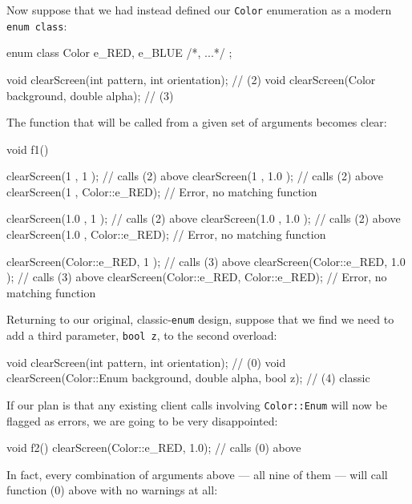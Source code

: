 \noindent Now suppose that we had instead defined our \texttt{Color} enumeration
as a modern \texttt{enum}~\texttt{class}:

\begin{emcppslisting}
enum class Color { e_RED, e_BLUE /*, ...*/ };

void clearScreen(int pattern, int orientation);    // (2)
void clearScreen(Color background, double alpha);  // (3)
\end{emcppslisting}

\noindent The function that will be called from a given set of arguments becomes
clear:

\begin{emcppslisting}
void f1()
{
    clearScreen(1           , 1           );  // calls (2) above
    clearScreen(1           , 1.0         );  // calls (2) above
    clearScreen(1           , Color::e_RED);  // Error, no matching function

    clearScreen(1.0         , 1           );  // calls (2) above
    clearScreen(1.0         , 1.0         );  // calls (2) above
    clearScreen(1.0         , Color::e_RED);  // Error, no matching function

    clearScreen(Color::e_RED, 1           );  // calls (3) above
    clearScreen(Color::e_RED, 1.0         );  // calls (3) above
    clearScreen(Color::e_RED, Color::e_RED);  // Error, no matching function
}
\end{emcppslisting}

\noindent Returning to our original, classic-\texttt{enum} design, suppose that we
find we need to add a third parameter, \texttt{bool}~\texttt{z}, to the
second overload:

\begin{emcppslisting}
void clearScreen(int pattern, int orientation);                  // (0)
void clearScreen(Color::Enum background, double alpha, bool z);  // (4) classic
\end{emcppslisting}

\noindent If our plan is that any existing client calls involving
\texttt{Color::Enum} will now be flagged as errors, we are going to be
very disappointed:

\begin{emcppslisting}
void f2()
{
    clearScreen(Color::e_RED, 1.0);  // calls (0) above
}
\end{emcppslisting}

\noindent In fact, every combination of arguments above --- all nine of them ---
will call function (0) above with no warnings at all:

